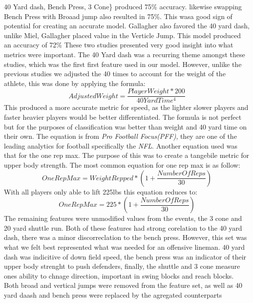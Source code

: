 \documentclass[confrence]{IEEEtran}
\begin{document}
40 Yard dash, Bench Press, 3 Cone\} produced 75\% accuracy. likewise swapping Bench Press with Broaad jump also resulted in 75\%.
This wasa good sign of potential for creating an accurate model. 
Gallagher also favored the 40 yard dash, unlike Miel, Gallagher placed value in the Verticle Jump. This model produced an accuracy of 72\%
These two studies presented very good insight into what metrics were important. 
The 40 Yard dash was a recurring theme amongst these studies, which was the first first feature used in our model.
However, unlike the previous studies we adjusted the 40 times to account for the weight of the athlete, this was done by applying the formula: 
\[
    AdjustedWeight = \frac{PlayerWeight*200}{40YardTime^4}
\]
This produced a more accurate metric for speed, as the lighter slower players and faster heavier players would be better differentiated.
The formula is not perfect but for the purposes of classification was better than weight and 40 yard time on their own. 
The equation is from \textit{Pro Football Focus(PFF)}, they are one of the leading analytics for football specifically the \textit{NFL}.
Another equation used was that for the one rep max. The purpose of this was to create a tangebile metric for upper body strength. 
The most common equation for one rep max is as follow:
\[
    OneRepMax = WeightRepped*(1+\frac{NumberOfReps}{30})
\]
With all players only able to lift 225lbs this equation reduces to:
\[
    OneRepMax = 225*(1+\frac{NumberOfReps}{30})
\]
The remaining features were unmodified values from the events, the 3 cone and 20 yard shuttle run. 
Both of these features had strong corelation to the 40 yard dash, there was a minor discorreclation to the bench press.
However, this set was what we felt best represented what was needed for an offensive lineman. 
40 yard dash was indicitive of down field speed, the bench press was an indicator of their upper body strenght to push defenders, finally, the shuttle and 3 cone measure ones ability to chnage direction, important in swing blocks and reach blocks.
Both broad and vertical jumps were removed from the feature set, as well as 40 yard daash and bench press were replaced by the agregated counterparts
\end{document}

